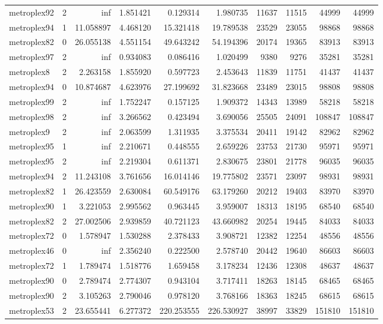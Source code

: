 \begin{longtable}{|l|r|r|r|r|r|r|r|r|r|}
metroplex92 & 2 & inf & 1.851421 & 0.129314 & 1.980735 & 11637 & 11515 & 44999 & 44999 \\
metroplex94 & 1 & 11.058897 & 4.468120 & 15.321418 & 19.789538 & 23529 & 23055 & 98868 & 98868 \\
metroplex82 & 0 & 26.055138 & 4.551154 & 49.643242 & 54.194396 & 20174 & 19365 & 83913 & 83913 \\
metroplex97 & 2 & inf & 0.934083 & 0.086416 & 1.020499 & 9380 & 9276 & 35281 & 35281 \\
metroplex8 & 2 & 2.263158 & 1.855920 & 0.597723 & 2.453643 & 11839 & 11751 & 41437 & 41437 \\
metroplex94 & 0 & 10.874687 & 4.623976 & 27.199692 & 31.823668 & 23489 & 23015 & 98808 & 98808 \\
metroplex99 & 2 & inf & 1.752247 & 0.157125 & 1.909372 & 14343 & 13989 & 58218 & 58218 \\
metroplex98 & 2 & inf & 3.266562 & 0.423494 & 3.690056 & 25505 & 24091 & 108847 & 108847 \\
metroplex9 & 2 & inf & 2.063599 & 1.311935 & 3.375534 & 20411 & 19142 & 82962 & 82962 \\
metroplex95 & 1 & inf & 2.210671 & 0.448555 & 2.659226 & 23753 & 21730 & 95971 & 95971 \\
metroplex95 & 2 & inf & 2.219304 & 0.611371 & 2.830675 & 23801 & 21778 & 96035 & 96035 \\
metroplex94 & 2 & 11.243108 & 3.761656 & 16.014146 & 19.775802 & 23571 & 23097 & 98931 & 98931 \\
metroplex82 & 1 & 26.423559 & 2.630084 & 60.549176 & 63.179260 & 20212 & 19403 & 83970 & 83970 \\
metroplex90 & 1 & 3.221053 & 2.995562 & 0.963445 & 3.959007 & 18313 & 18195 & 68540 & 68540 \\
metroplex82 & 2 & 27.002506 & 2.939859 & 40.721123 & 43.660982 & 20254 & 19445 & 84033 & 84033 \\
metroplex72 & 0 & 1.578947 & 1.530288 & 2.378433 & 3.908721 & 12382 & 12254 & 48556 & 48556 \\
metroplex46 & 0 & inf & 2.356240 & 0.222500 & 2.578740 & 20442 & 19640 & 86603 & 86603 \\
metroplex72 & 1 & 1.789474 & 1.518776 & 1.659458 & 3.178234 & 12436 & 12308 & 48637 & 48637 \\
metroplex90 & 0 & 2.789474 & 2.774307 & 0.943104 & 3.717411 & 18263 & 18145 & 68465 & 68465 \\
metroplex90 & 2 & 3.105263 & 2.790046 & 0.978120 & 3.768166 & 18363 & 18245 & 68615 & 68615 \\
metroplex53 & 2 & 23.655441 & 6.277372 & 220.253555 & 226.530927 & 38997 & 33829 & 151810 & 151810 \\
\end{longtable}
